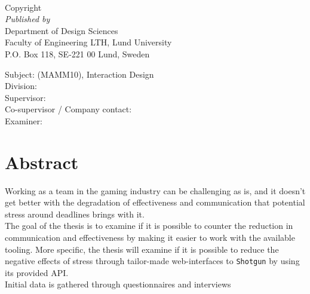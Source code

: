\documentclass[a4paper,11pt]{article}
\begin{document}


\clearpage

{\Large \titleFull}
\vspace{1.5cm} \\
\begin{large}
  Copyright \textcopyright \ \the\year \ \name \\

  \textit{Published by} \vspace{0.2cm} \\
      Department of Design Sciences \\
      Faculty of Engineering LTH, Lund University \\
      P.O. Box 118, SE-221 00 Lund, Sweden

  \vspace{0.8cm}
  Subject: (MAMM10), Interaction Design \\
  Division: \division \\
  Supervisor: \supervisor \\
  Co-supervisor / Company contact: \contact \\
  Examiner: \examiner \\


\end{large}

\clearpage


\section*{Abstract}


  Working as a team in the gaming industry can be challenging as is, and it
  doesn't get better with the degradation of effectiveness and communication
  that potential stress around deadlines brings with it. \\

  The goal of the thesis is to examine if it is possible to counter the reduction
  in communication and effectiveness by making it easier to work with the
  available tooling. More specific, the thesis will examine if it is possible
  to reduce the negative effects of stress through tailor-made web-interfaces to
  \texttt{Shotgun} by using its provided API.\\

  Initial data is gathered through questionnaires and interviews \\
\end{document}
